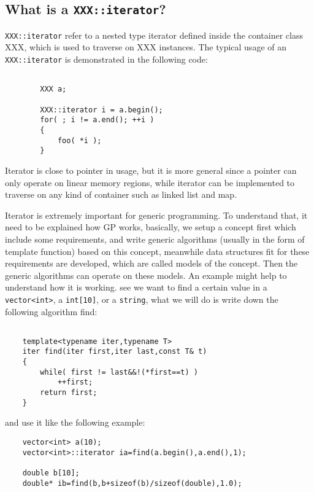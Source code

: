 \documentclass[letterpaper]{book}
\begin{document}
\subsection{What is a \lstinline$XXX::iterator$?}
  \lstinline$XXX::iterator$ refer to a nested type iterator defined inside 
the container class XXX, which is used to traverse on XXX instances. The 
typical usage of an \lstinline$XXX::iterator$ is demonstrated in the 
following code:

\begin{lstlisting}

        XXX a;

        XXX::iterator i = a.begin();
        for( ; i != a.end(); ++i )
        {
            foo( *i );
        }

\end{lstlisting}

Iterator is close to pointer in usage, but it is more general since a pointer
can only operate on linear memory regions, while iterator can be implemented
to traverse on any kind of container such as linked list and map. 

  Iterator is extremely important for generic programming. To understand that,
it need to be explained how GP works, basically, we setup a concept first which
include some requirements, and write generic algorithms (usually in the form of
template function) based on this concept, meanwhile data structures fit for these
requirements are developed, which are called models of the concept. Then the
generic algorithms can operate on these models. An example might help to understand
how it is working. see we want to find a certain
value in a \lstinline$vector<int>$, a \lstinline$int[10]$, or a \lstinline$string$, 
what we will do is write down the following algorithm find:
\begin{lstlisting}

    template<typename iter,typename T>
    iter find(iter first,iter last,const T& t)
    {
        while( first != last&&!(*first==t) )
            ++first;
        return first;
    }

\end{lstlisting}

and use it like the following example:

\begin{lstlisting}
    vector<int> a(10);
    vector<int>::iterator ia=find(a.begin(),a.end(),1);

    double b[10];
    double* ib=find(b,b+sizeof(b)/sizeof(double),1.0);

\end{lstlisting}
\end{document}
